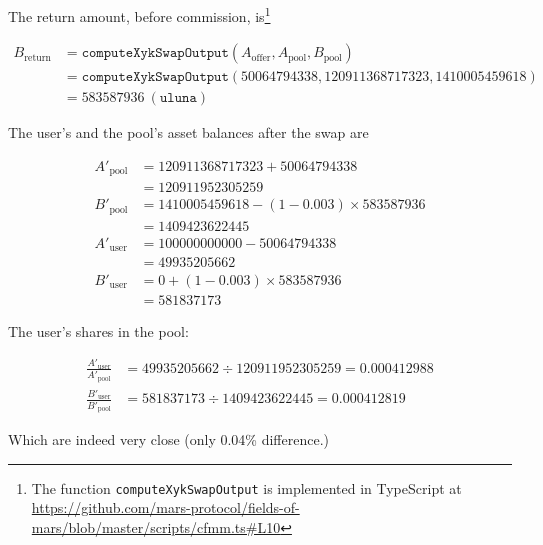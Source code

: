 \documentclass{article}
\begin{document}
The return amount, before commission, is\footnote{The function \texttt{computeXykSwapOutput} is implemented in TypeScript at \url{https://github.com/mars-protocol/fields-of-mars/blob/master/scripts/cfmm.ts#L10}}

\begin{align*}
B_{\mathrm{return}} 
  &= \mathtt{computeXykSwapOutput}(A_{\mathrm{offer}}, A_{\mathrm{pool}}, B_{\mathrm{pool}}) \\
  &= \mathtt{computeXykSwapOutput}(50064794338, 120911368717323, 1410005459618) \\
  &= 583587936 \ (\mathtt{uluna})
\end{align*}

The user's and the pool's asset balances after the swap are

\begin{align*}
A'_{\mathrm{pool}} 
  &= 120911368717323 + 50064794338 \\
  &= 120911952305259 \\
B'_{\mathrm{pool}} 
  &= 1410005459618 - (1 - 0.003) \times 583587936 \\
  &= 1409423622445 \\
A'_{\mathrm{user}} 
  &= 100000000000 - 50064794338 \\
  &= 49935205662 \\
B'_{\mathrm{user}} 
  &= 0 + (1 - 0.003) \times 583587936 \\
  &= 581837173
\end{align*}

The user's shares in the pool:

\begin{align*}
\frac{A'_{\mathrm{user}}}{A'_{\mathrm{pool}}} 
  &= 49935205662 \div 120911952305259 = 0.000412988 \\
\frac{B'_{\mathrm{user}}}{B'_{\mathrm{pool}}}
  &= 581837173 \div 1409423622445 = 0.000412819
\end{align*}

Which are indeed very close (only 0.04\% difference.)
\end{document}
